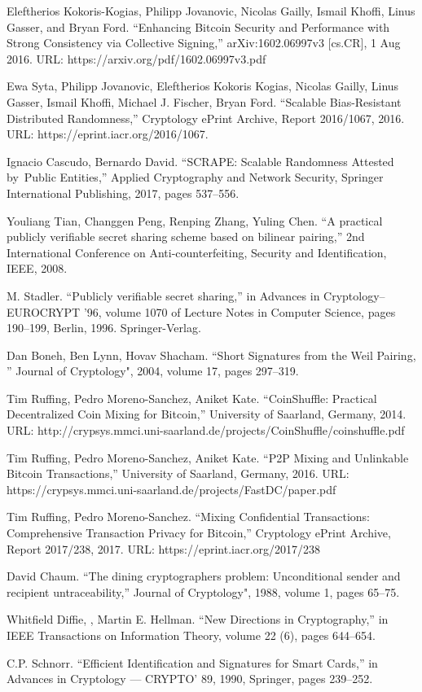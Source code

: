 \documentclass[8pt,fleqn,openany]{book}
\begin{document}
\begin{thebibliography}{99}
 Eleftherios Kokoris-Kogias, Philipp Jovanovic, Nicolas Gailly,
Ismail Khoffi, Linus Gasser, and Bryan Ford. ``Enhancing Bitcoin Security and Performance with Strong Consistency via Collective Signing,'' arXiv:1602.06997v3 [cs.CR], 1 Aug 2016. URL: https://arxiv.org/pdf/1602.06997v3.pdf

 Ewa Syta, Philipp Jovanovic, Eleftherios Kokoris Kogias, Nicolas Gailly, Linus Gasser, Ismail Khoffi, Michael J. Fischer, Bryan Ford. ``Scalable Bias-Resistant Distributed Randomness,'' Cryptology ePrint Archive, Report 2016/1067, 2016. URL: https://eprint.iacr.org/2016/1067.

 Ignacio Cascudo, Bernardo David. ``SCRAPE: Scalable Randomness Attested by Public Entities,'' Applied Cryptography and Network Security, Springer International Publishing, 2017, pages 537--556.

 Youliang Tian, Changgen Peng, Renping Zhang, Yuling Chen. ``A practical publicly verifiable secret sharing scheme based on bilinear pairing,'' 2nd International Conference on Anti-counterfeiting, Security and Identification, IEEE, 2008.

 M. Stadler. ``Publicly verifiable secret sharing,'' in Advances in Cryptology--EUROCRYPT ’96, volume 1070 of Lecture Notes in Computer Science, pages 190--199, Berlin, 1996. Springer-Verlag.

 Dan Boneh, Ben Lynn, Hovav Shacham. ``Short Signatures from the Weil Pairing, '' Journal of Cryptology", 2004, volume 17, pages 297--319.

 Tim Ruffing, Pedro Moreno-Sanchez, Aniket Kate. ``CoinShuffle: Practical Decentralized Coin Mixing for Bitcoin,'' University of Saarland, Germany, 2014. URL: http://crypsys.mmci.uni-saarland.de/projects/CoinShuffle/coinshuffle.pdf

 Tim Ruffing, Pedro Moreno-Sanchez, Aniket Kate. ``P2P Mixing and Unlinkable Bitcoin Transactions,'' University of Saarland, Germany, 2016. URL: https://crypsys.mmci.uni-saarland.de/projects/FastDC/paper.pdf

 Tim Ruffing, Pedro Moreno-Sanchez. ``Mixing Confidential Transactions: Comprehensive Transaction Privacy for Bitcoin,'' Cryptology ePrint Archive, Report 2017/238, 2017. URL: https://eprint.iacr.org/2017/238

 David Chaum. ``The dining cryptographers problem: Unconditional sender and recipient untraceability,'' Journal of Cryptology", 1988, volume 1, pages 65--75.

 Whitfield Diffie, , Martin E. Hellman. ``New Directions in Cryptography,''   in IEEE Transactions on Information Theory, volume 22 (6), pages 644--654. 

 C.P. Schnorr. ``Efficient Identification and Signatures for Smart Cards,''
in Advances in Cryptology --- CRYPTO' 89, 1990, Springer, pages 239--252.

\end{thebibliography}
\end{document}
